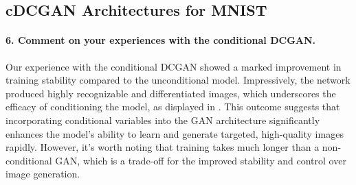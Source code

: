 \subsection{cDCGAN Architectures for MNIST}

\paragraph*{6. Comment on your experiences with the conditional DCGAN.}

Our experience with the conditional DCGAN showed a marked improvement in training stability compared to the unconditional model. Impressively, the network produced highly recognizable and differentiated images, which underscores the efficacy of conditioning the model, as displayed in . This outcome suggests that incorporating conditional variables into the GAN architecture significantly enhances the model's ability to learn and generate targeted, high-quality images rapidly. However, it's worth noting that training takes much longer than a non-conditional GAN, which is a trade-off for the improved stability and control over image generation.

